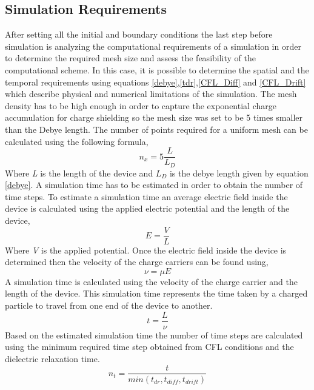 \begin{doublespace}
\section{Simulation Requirements}
After setting all the initial and boundary conditions the last step before simulation is analyzing the computational requirements of a simulation in order to determine the required mesh size and assess the feasibility of the computational scheme. In this case, it is possible to determine the spatial and the temporal requirements using  equations \ref{debye},\ref{tdr},\ref{CFL_Diff} and \ref{CFL_Drift} which describe physical and numerical limitations of the simulation. The mesh density has to be high enough in order to capture the exponential charge accumulation for charge shielding so the mesh size was set to be 5 times smaller than the Debye length. The number of points required for a uniform mesh can be calculated using the following formula,
\begin{equation}
n_x = 5\frac{L}{L_{D}}
\end{equation} 
Where \textit{L} is the length of the device and $L_{D}$ is the debye length given by equation \ref{debye}. A simulation time has to be estimated in order to obtain the number of time steps. To estimate a simulation time an average electric field inside the device is calculated using the applied electric potential and the length of the device,
\begin{equation}
E = \frac{V}{L}
\end{equation} 
Where \textit{V} is the applied potential. Once the electric field inside the device is determined then the velocity of the charge carriers can be found using,
\begin{equation}
\nu = \mu E
\end{equation} 
A simulation time is calculated using the velocity of the charge carrier and the length of the device. This simulation time represents the time taken by a charged particle to travel from one end of the device to another.  
\begin{equation}
t = \frac{L}{\nu} 
\end{equation} 
Based on the estimated simulation time the number of time steps are calculated using the minimum required time step obtained from CFL conditions and the dielectric relaxation time.
\begin{equation}
n_{t} = \frac{t}{min(t_{dr},t_{diff},t_{drift})} 
\end{equation} 
 \begin{table}

\end{table}
\end{doublespace}

